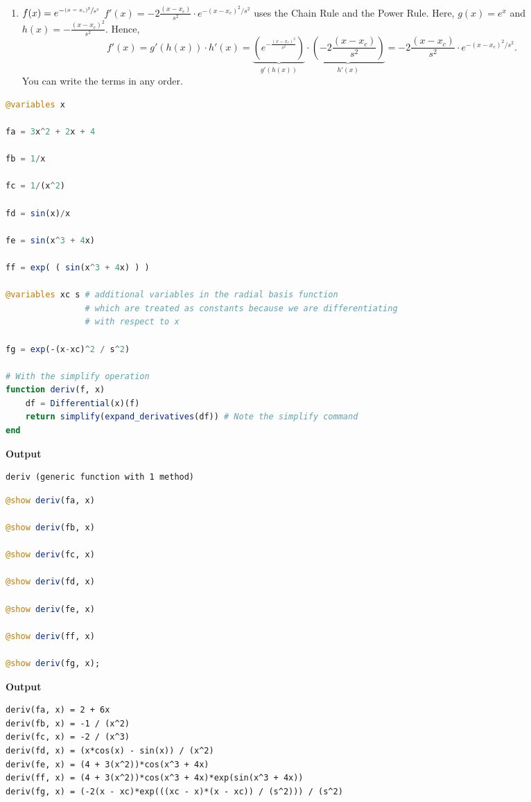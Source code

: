 \begin{enumerate}
     \item $f(x) = e^{-\sfrac{(x-x_c)^2}{s^2}}$  \Ans $f'(x) = -2\frac{(x-x_c)}{s^2} \cdot e^{-(x-x_c)^2 / s^2}$ uses the Chain Rule and the Power Rule. Here, $g(x) = e^x$ and $h(x) = -\frac{(x-x_c)^2}{s^2}$. Hence, $$f'(x) = g'(h(x)) \cdot h'(x) = \underbrace{\left(e^{-\frac{(x-x_c)^2}{s^2}}\right)}_{g'(h(x)) } \cdot \underbrace{\left(-2\frac{(x-x_c)}{s^2}\right)}_{h'(x)} =-2\frac{(x-x_c)}{s^2} \cdot e^{-(x-x_c)^2 / s^2}.$$
     You can write the terms in any order.

    \end{enumerate}




\begin{lstlisting}[language=Julia,style=mystyle]
@variables x

fa = 3x^2 + 2x + 4

fb = 1/x

fc = 1/(x^2) 

fd = sin(x)/x

fe = sin(x^3 + 4x)

ff = exp( ( sin(x^3 + 4x) ) )

@variables xc s # additional variables in the radial basis function
                # which are treated as constants because we are differentiating
                # with respect to x

fg = exp(-(x-xc)^2 / s^2)

# With the simplify operation
function deriv(f, x)
    df = Differential(x)(f)
    return simplify(expand_derivatives(df)) # Note the simplify command
end
\end{lstlisting}
\textbf{Output} 
\begin{verbatim}
deriv (generic function with 1 method)
\end{verbatim}

\begin{lstlisting}[language=Julia,style=mystyle]
@show deriv(fa, x)

@show deriv(fb, x)

@show deriv(fc, x)

@show deriv(fd, x)

@show deriv(fe, x)

@show deriv(ff, x)

@show deriv(fg, x);
\end{lstlisting}
\textbf{Output} 
\begin{verbatim}
deriv(fa, x) = 2 + 6x
deriv(fb, x) = -1 / (x^2)
deriv(fc, x) = -2 / (x^3)
deriv(fd, x) = (x*cos(x) - sin(x)) / (x^2)
deriv(fe, x) = (4 + 3(x^2))*cos(x^3 + 4x)
deriv(ff, x) = (4 + 3(x^2))*cos(x^3 + 4x)*exp(sin(x^3 + 4x))
deriv(fg, x) = (-2(x - xc)*exp(((xc - x)*(x - xc)) / (s^2))) / (s^2)
\end{verbatim}


